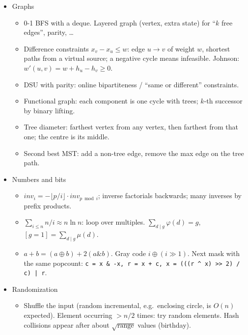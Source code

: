 \begin{itemize}
\item Graphs
\begin{itemize}
  \item 0-1 BFS with a deque. Layered graph (vertex, extra state) for ``$k$ free edges'', parity, \ldots
  \item Difference constraints $x_v - x_u \le w$: edge $u \to v$ of weight $w$, shortest paths from a virtual source; a negative cycle means infeasible. Johnson: $w'(u, v) = w + h_u - h_v \ge 0$.
  \item DSU with parity: online bipartiteness / ``same or different'' constraints.
  \item Functional graph: each component is one cycle with trees; $k$-th successor by binary lifting.
  \item Tree diameter: farthest vertex from any vertex, then farthest from that one; the centre is its middle.
  \item Second best MST: add a non-tree edge, remove the max edge on the tree path.
\end{itemize}

\item Numbers and bits
\begin{itemize}
  \item $inv_i = -\lfloor p / i \rfloor \cdot inv_{p \bmod i}$; inverse factorials backwards; many inverses by prefix products.
  \item $\sum_{i \le n} n / i \approx n \ln n$: loop over multiples. $\sum_{d \mid g} \varphi(d) = g$, $[g = 1] = \sum_{d \mid g} \mu(d)$.
  \item $a + b = (a \oplus b) + 2(a \mathbin{\&} b)$. Gray code $i \oplus (i \gg 1)$. Next mask with the same popcount: \texttt{c = x \& -x, r = x + c, x = (((r \^{} x) >> 2) / c) | r}.
\end{itemize}

\item Randomization
\begin{itemize}
  \item Shuffle the input (random incremental, e.g.\ enclosing circle, is $O(n)$ expected). Element occurring $> n/2$ times: try random elements. Hash collisions appear after about $\sqrt{\text{range}}$ values (birthday).
\end{itemize}
\end{itemize}
